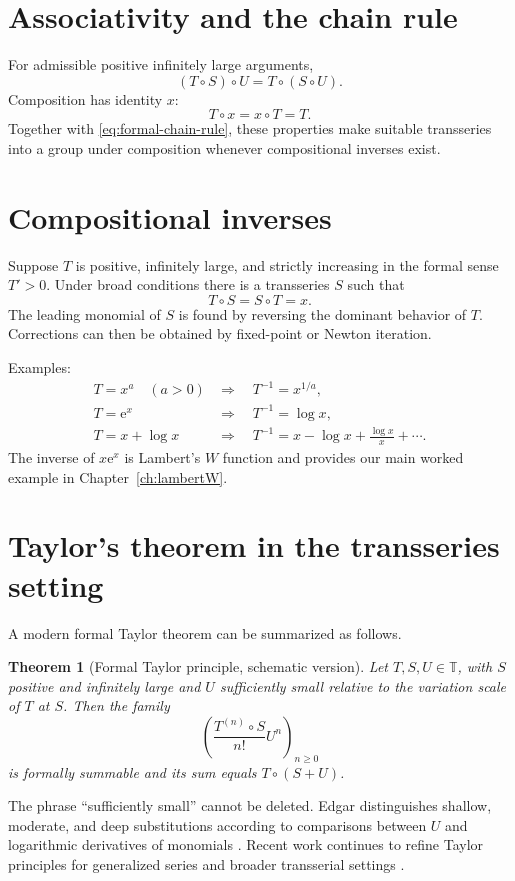 \documentclass[11pt,openany]{book}
\theoremstyle{definition}
\theoremstyle{plain}
\newtheorem{theorem}{Theorem}[chapter]
\theoremstyle{remark}
\newcommand{\T}{\mathbb{T}}
\newcommand{\e}{\mathrm{e}}
\begin{document}
\section{Associativity and the chain rule}

For admissible positive infinitely large arguments,
\[
 (T\circ S)\circ U=T\circ(S\circ U).
\]
Composition has identity $x$:
\[
 T\circ x=x\circ T=T.
\]
Together with \cref{eq:formal-chain-rule}, these properties make suitable transseries into a group under composition whenever compositional inverses exist.

\section{Compositional inverses}

Suppose $T$ is positive, infinitely large, and strictly increasing in the formal sense $T'>0$. Under broad conditions there is a transseries $S$ such that
\[
 T\circ S=S\circ T=x.
\]
The leading monomial of $S$ is found by reversing the dominant behavior of $T$. Corrections can then be obtained by fixed-point or Newton iteration.

Examples:
\begin{align*}
 T=x^a\quad(a>0)
 &\Longrightarrow\quad T^{-1}=x^{1/a},\\
 T=\e^x
 &\Longrightarrow\quad T^{-1}=\log x,\\
 T=x+\log x
 &\Longrightarrow\quad T^{-1}=x-\log x+\frac{\log x}{x}+\cdots.
\end{align*}
The inverse of $x\e^x$ is Lambert's $W$ function and provides our main worked example in Chapter~\ref{ch:lambertW}.

\section{Taylor's theorem in the transseries setting}

A modern formal Taylor theorem can be summarized as follows.

\begin{theorem}[Formal Taylor principle, schematic version]\label{thm:taylor-schematic}
Let $T,S,U\in\T$, with $S$ positive and infinitely large and $U$ sufficiently small relative to the variation scale of $T$ at $S$. Then the family
\[
 \left(\frac{T^{(n)}\circ S}{n!}U^n\right)_{n\ge0}
\]
is formally summable and its sum equals $T\circ(S+U)$.
\end{theorem}

The phrase ``sufficiently small'' cannot be deleted. Edgar distinguishes shallow, moderate, and deep substitutions according to comparisons between $U$ and logarithmic derivatives of monomials \cite{edgar-composition,edgar-fractional}. Recent work continues to refine Taylor principles for generalized series and broader transserial settings \cite{bagayoko-mantova-taylor,mantova-monotonicity}.
\end{document}
